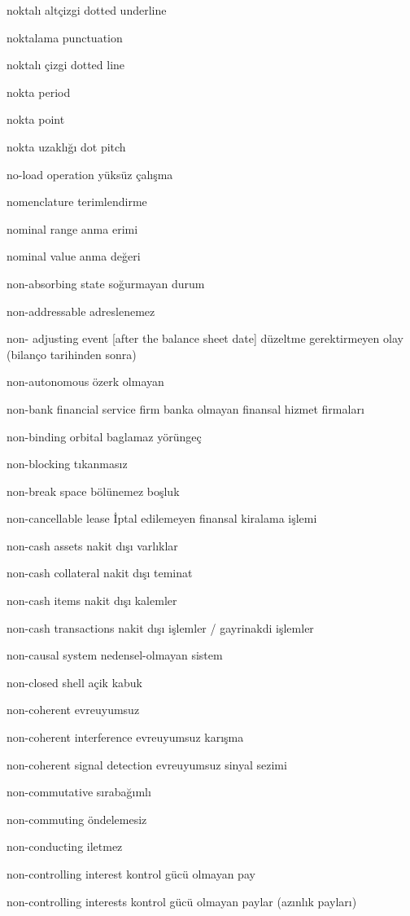 \documentclass[12pt,fleqn]{article}\usepackage{../../common}
\begin{document}
noktalı altçizgi dotted underline

noktalama punctuation

noktalı çizgi dotted line

nokta period

nokta point

nokta uzaklığı dot pitch

no-load operation yüksüz çalışma

nomenclature terimlendirme

nominal range anma erimi

nominal value anma değeri

non-absorbing state soğurmayan durum

non-addressable adreslenemez

non- adjusting event [after the balance sheet date] düzeltme gerektirmeyen olay (bilanço tarihinden sonra)

non-autonomous özerk olmayan

non-bank financial service firm banka olmayan finansal hizmet firmaları

non-binding orbital baglamaz yörüngeç

non-blocking tıkanmasız

non-break space bölünemez boşluk

non-cancellable lease İptal edilemeyen finansal kiralama işlemi

non-cash assets nakit dışı varlıklar

non-cash collateral nakit dışı teminat

non-cash items nakit dışı kalemler

non-cash transactions nakit dışı işlemler / gayrinakdi işlemler

non-causal system nedensel-olmayan sistem

non-closed shell açik kabuk

non-coherent evreuyumsuz

non-coherent interference evreuyumsuz karışma

non-coherent signal detection evreuyumsuz sinyal sezimi

non-commutative sırabağımlı

non-commuting öndelemesiz

non-conducting iletmez

non-controlling interest kontrol gücü olmayan pay

non-controlling interests kontrol gücü olmayan paylar (azınlık payları)
\end{document}
